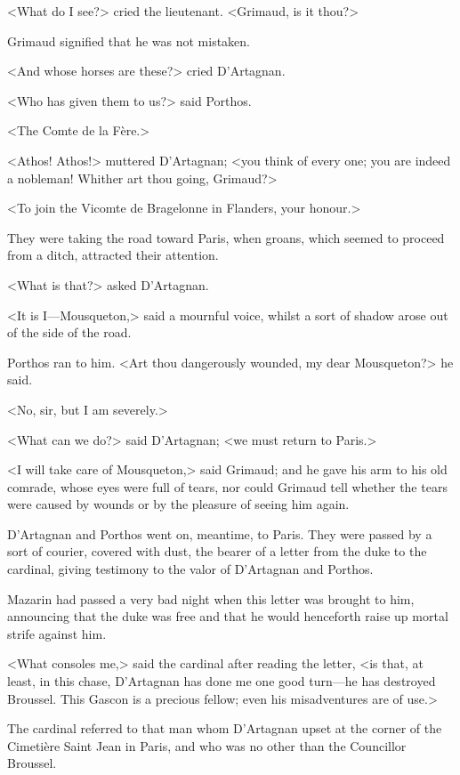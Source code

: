 <What do I see?> cried the lieutenant. <Grimaud, is it thou?>

Grimaud signified that he was not mistaken.

<And whose horses are these?> cried D'Artagnan.

<Who has given them to us?> said Porthos.

<The Comte de la Fère.>

<Athos! Athos!> muttered D'Artagnan; <you think of every one; you are indeed a nobleman! Whither art thou going, Grimaud?>

<To join the Vicomte de Bragelonne in Flanders, your honour.>

They were taking the road toward Paris, when groans, which seemed to proceed from a ditch, attracted their attention.

<What is that?> asked D'Artagnan.

<It is I—Mousqueton,> said a mournful voice, whilst a sort of shadow arose out of the side of the road.

Porthos ran to him. <Art thou dangerously wounded, my dear Mousqueton?> he said.

<No, sir, but I am severely.>

<What can we do?> said D'Artagnan; <we must return to Paris.>

<I will take care of Mousqueton,> said Grimaud; and he gave his arm to his old comrade, whose eyes were full of tears, nor could Grimaud tell whether the tears were caused by wounds or by the pleasure of seeing him again.

D'Artagnan and Porthos went on, meantime, to Paris. They were passed by a sort of courier, covered with dust, the bearer of a letter from the duke to the cardinal, giving testimony to the valor of D'Artagnan and Porthos.

Mazarin had passed a very bad night when this letter was brought to him, announcing that the duke was free and that he would henceforth raise up mortal strife against him.

<What consoles me,> said the cardinal after reading the letter, <is that, at least, in this chase, D'Artagnan has done me one good turn—he has destroyed Broussel. This Gascon is a precious fellow; even his misadventures are of use.>

The cardinal referred to that man whom D'Artagnan upset at the corner of the Cimetière Saint Jean in Paris, and who was no other than the Councillor Broussel. 
